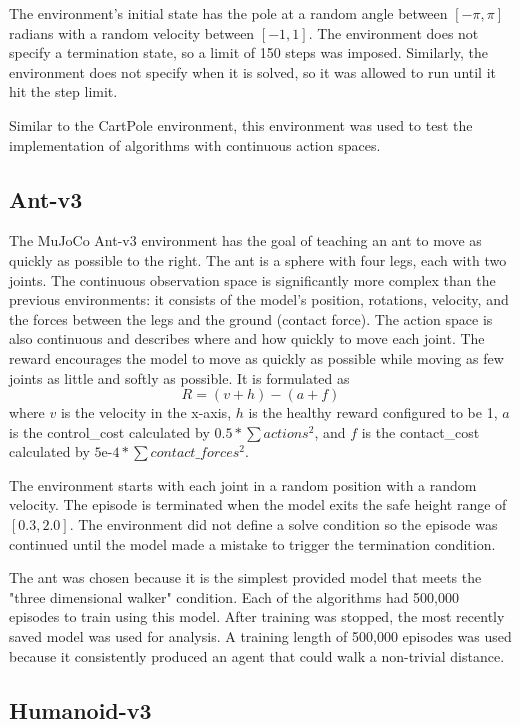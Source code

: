 \documentclass[conference]{IEEEtran}
\begin{document}
The environment's initial state has the pole at a random angle between $[-\pi, \pi]$ radians with a random velocity between $[-1, 1]$. The environment does not specify a termination state, so a limit of 150 steps was imposed. Similarly, the environment does not specify when it is solved, so it was allowed to run until it hit the step limit.

Similar to the CartPole environment, this environment was used to test the implementation of algorithms with continuous action spaces.

\subsection{Ant-v3}

The MuJoCo Ant-v3 environment has the goal of teaching an ant to move as quickly as possible to the right. The ant is a sphere with four legs, each with two joints. The continuous observation space is significantly more complex than the previous environments: it consists of the model's position, rotations, velocity, and the forces between the legs and the ground (contact force). The action space is also continuous and describes where and how quickly to move each joint. The reward encourages the model to move as quickly as possible while moving as few joints as little and softly as possible. It is formulated as
$$
    R = (v + h) - (a + f)
$$
where $v$ is the velocity in the x-axis, $h$ is the healthy reward configured to be 1, $a$ is the control\_cost calculated by $0.5* \sum actions^{2}$, and $f$ is the contact\_cost calculated by $5\text{e-}4 * \sum contact\_forces^{2}$.

The environment starts with each joint in a random position with a random velocity. The episode is terminated when the model exits the safe height range of $[0.3, 2.0]$. The environment did not define a solve condition so the episode was continued until the model made a mistake to trigger the termination condition.

The ant was chosen because it is the simplest provided model that meets the "three dimensional walker" condition. Each of the algorithms had 500,000 episodes to train using this model. After training was stopped, the most recently saved model was used for analysis. A training length of 500,000 episodes was used because it consistently produced an agent that could walk a non-trivial distance.

\subsection{Humanoid-v3}
\end{document}
